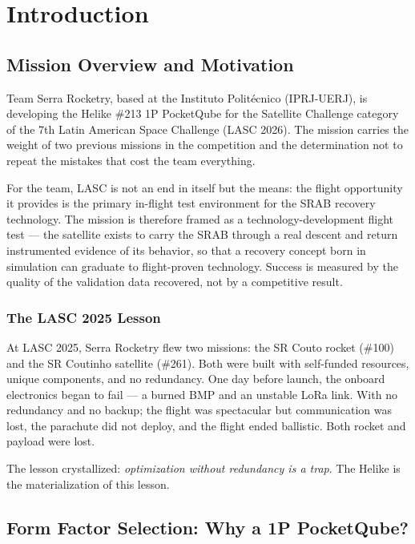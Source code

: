 \section{Introduction}

\subsection{Mission Overview and Motivation}

Team Serra Rocketry, based at the Instituto Politécnico
(IPRJ-UERJ), is developing the Helike \#213 1P PocketQube for the
Satellite Challenge category of the 7th Latin American Space Challenge
(LASC 2026). The mission carries the
weight of two previous missions in the competition and the
determination not to repeat the mistakes that cost the team everything.

For the team, LASC is not an end in itself but the means: the flight
opportunity it provides is the primary in-flight test environment for
the SRAB recovery technology. The mission is therefore framed as a
technology-development flight test --- the satellite exists to carry
the SRAB through a real descent and return instrumented evidence of
its behavior, so that a recovery concept born in simulation can
graduate to flight-proven technology. Success is measured by the
quality of the validation data recovered, not by a competitive
result.

\subsubsection{The LASC 2025 Lesson}

At LASC 2025, Serra Rocketry flew two missions: the SR Couto rocket
(\#100) and the SR Coutinho satellite (\#261). Both were built with
self-funded resources, unique components, and no redundancy. One day
before launch, the onboard electronics began to fail — a burned BMP and
an unstable LoRa link. With no redundancy and no backup;
the flight was spectacular but
communication was lost, the parachute did not deploy, and the flight
ended ballistic. Both rocket and payload were lost.

The lesson crystallized: \emph{optimization without redundancy is a
trap}. The Helike is the materialization of this lesson.

\subsection{Form Factor Selection: Why a 1P PocketQube?}

